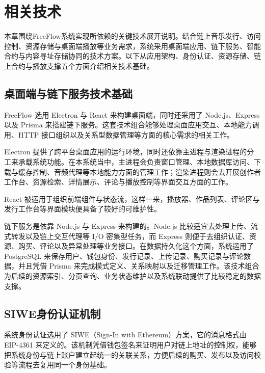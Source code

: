 
\chapter{相关技术}

本章围绕FreeFlow系统实现所依赖的关键技术展开说明。结合链上音乐发行、访问控制、资源存储与桌面端播放等业务需求，系统采用桌面端应用、链下服务、智能合约与内容寻址存储协同的技术方案。以下从应用架构、身份认证、资源存储、链上合约与播放支撑五个方面介绍相关技术基础。

\section{桌面端与链下服务技术基础}

FreeFlow 选用 Electron 与 React 来构建桌面端，同时还采用了 Node.js、Express 以及 Prisma 来搭建链下服务。这套技术组合能够处理桌面应用交互、本地能力调用、HTTP 接口组织以及关系型数据管理等方面的核心需求的相关工作。

Electron 提供了跨平台桌面应用的运行环境，同时还依靠主进程与渲染进程的分工来承载系统功能\cite{electronDocs,electronIPC}。在本系统当中，主进程会负责窗口管理、本地数据库访问、下载与缓存控制、音频代理等本地能力方面的管理工作；渲染进程则会去开展创作者工作台、资源检索、详情展示、评论与播放控制等界面交互方面的工作。

React 被运用于组织前端组件与状态流，这样一来，播放器、作品列表、评论区与发行工作台等界面模块便具备了较好的可维护性\cite{reactDocs}。

链下服务是依靠 Node.js 与 Express 来构建的。Node.js 比较适宜去处理上传、流式转发以及链上交互代理等 I/O 密集型任务，而 Express 则便于去组织认证、资源、购买、评论以及异常处理等业务接口\cite{nodeDocs,expressDocs}。在数据持久化这个方面，系统运用了 PostgreSQL 来保存用户、钱包身份、发行记录、上传记录、购买记录与评论数据，并且凭借 Prisma 来完成模式定义、关系映射以及迁移管理工作\cite{prismaDocs}。该技术组合为后续的资源索引、分页查询、业务状态维护以及系统联动提供了比较稳定的数据支撑。

\section{SIWE身份认证机制}

系统身份认证选用了 SIWE（Sign-In with Ethereum）方案，它的消息格式由 EIP-4361 来定义的\cite{eip4361}。该机制凭借钱包签名来证明用户对链上地址的控制权，能够把系统身份与链上账户建立起统一的关联关系，方便后续的购买、发布以及访问校验等流程去复用同一个身份基础。

